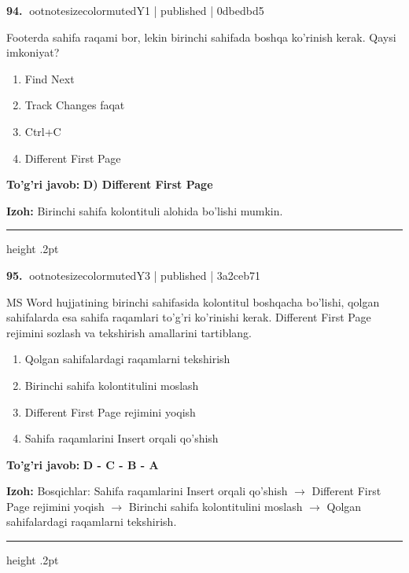 \documentclass[10pt,a4paper]{article}
\begin{document}
\textbf{\color{ink}94.} {ootnotesizecolor{muted}Y1 | published | 0dbedbd5}
\par
Footerda sahifa raqami bor, lekin birinchi sahifada boshqa ko'rinish kerak. Qaysi imkoniyat?
\begin{enumerate}[label=\Alph*),leftmargin=9mm]
\item Find Next
\item Track Changes faqat
\item Ctrl+C
\item Different First Page
\end{enumerate}
\begin{tcolorbox}[enhanced,breakable,colback=teal!4,colframe=teal!55!black,boxrule=0.45pt,arc=1.2mm,left=2.8mm,right=2.8mm,top=2mm,bottom=2mm]
\textbf{\color{teal}To'g'ri javob:} \textbf{D) Different First Page}
\par\smallskip
\textbf{Izoh:} Birinchi sahifa kolontituli alohida bo'lishi mumkin.
\end{tcolorbox}
\vspace{2mm}\hrule height .2pt\vspace{2mm}

\textbf{\color{ink}95.} {ootnotesizecolor{muted}Y3 | published | 3a2ceb71}
\par
MS Word hujjatining birinchi sahifasida kolontitul boshqacha bo'lishi, qolgan sahifalarda esa sahifa raqamlari to'g'ri ko'rinishi kerak. Different First Page rejimini sozlash va tekshirish amallarini tartiblang.
\begin{enumerate}[label=\Alph*),leftmargin=9mm]
\item Qolgan sahifalardagi raqamlarni tekshirish
\item Birinchi sahifa kolontitulini moslash
\item Different First Page rejimini yoqish
\item Sahifa raqamlarini Insert orqali qo'shish
\end{enumerate}
\begin{tcolorbox}[enhanced,breakable,colback=teal!4,colframe=teal!55!black,boxrule=0.45pt,arc=1.2mm,left=2.8mm,right=2.8mm,top=2mm,bottom=2mm]
\textbf{\color{teal}To'g'ri javob:} \textbf{D - C - B - A}
\par\smallskip
\textbf{Izoh:} Bosqichlar: Sahifa raqamlarini Insert orqali qo'shish \ensuremath{\rightarrow} Different First Page rejimini yoqish \ensuremath{\rightarrow} Birinchi sahifa kolontitulini moslash \ensuremath{\rightarrow} Qolgan sahifalardagi raqamlarni tekshirish.
\end{tcolorbox}
\vspace{2mm}\hrule height .2pt\vspace{2mm}
\end{document}
